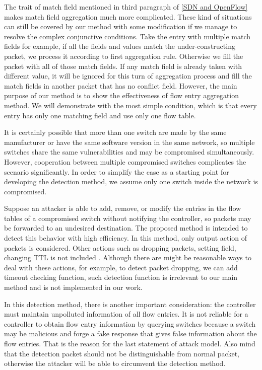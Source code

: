The trait of match field mentioned in third paragraph of \ref{SDN and OpenFlow} makes match field aggregation much more complicated. These kind of situations can still be covered by our method with some modification if we manage to resolve the complex conjunctive conditions. Take the entry with multiple match fields for example, if all the fields and values match the under-constructing packet, we process it according to first aggregation rule. Otherwise we fill the packet with all of those match fields. If any match field is already taken with different value, it will be ignored for this turn of aggregation process and fill the match fields in another packet that has no conflict field. However, the main purpose of our method is to show the effectiveness of flow entry aggregation method. We will demonstrate with the most simple condition, which is that every entry has only one matching field and use only one flow table.

It is certainly possible that more than one switch are made by the same manufacturer or have the same software version in the same network, so multiple switches share the same vulnerabilities and may be compromised simultaneously. However, cooperation between multiple compromised switches complicates the scenario significantly. In order to simplify the case as a starting point for developing the detection method, we assume only one switch inside the network is compromised.

Suppose an attacker is able to add, remove, or modify the entries in the flow tables of a compromised
switch without notifying the controller, so packets may be forwarded to an undesired destination. The proposed method is intended to detect this behavior with high efficiency. In this method, only output action of packets is considered. Other actions such as dropping packets, setting field, changing TTL is not included \sout{}. Although there are might be reasonable ways to deal with these actions, for example, to detect packet dropping, we can add timeout checking function, such detection function is irrelevant to our main method and is not implemented in our work.

In this detection method, there is another important consideration: the controller must maintain unpolluted information of all flow entries. It is not reliable for a controller to obtain flow entry information by querying switches because a switch may be malicious and forge a fake response that gives false information about the flow entries. That is the reason for the last statement of attack model. Also mind that the detection packet should not be distinguishable from normal packet, otherwise the attacker will be able to circumvent the detection method. 
